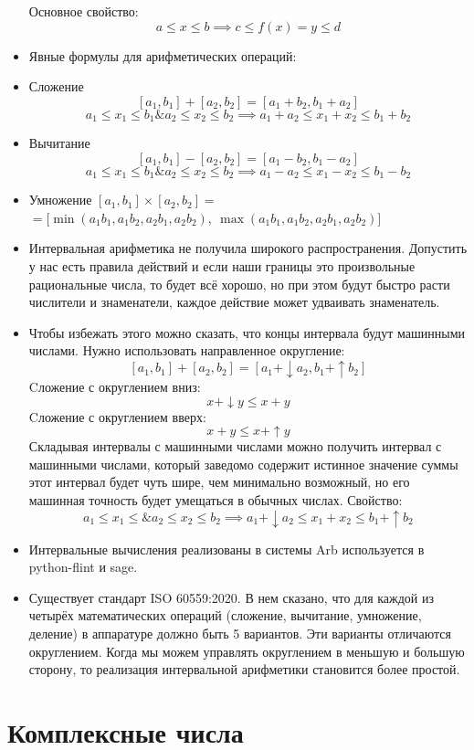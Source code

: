 \documentclass{article}
\begin{document}
\begin{itemize}
Основное свойство:
\[ a \leq x \leq b \implies c \leq f(x) = y \leq d \]
\item[] Явные формулы для арифметических операций:
\item[]Сложение
\[ [a_1, b_1] + [a_2, b_2] = [a_1 + b_2, b_1 + a_2] \]
\[ a_1 \leq x_1 \leq b_1 \& a_2 \leq x_2 \leq b_2 \implies a_1 + a_2 \leq x_1 + x_2 \leq b_1 + b_2 \]
\item[] Вычитание
\[ [a_1, b_1] - [a_2, b_2] = [a_1 - b_2, b_1 - a_2] \]
\[ a_1 \leq x_1 \leq b_1 \& a_2 \leq x_2 \leq b_2 \implies a_1 - a_2 \leq x_1 - x_2 \leq b_1 - b_2 \]
\item[] Умножение
 $[a_1, b_1] \times [a_2, b_2] = $
$= \bigl[\min(a_1 b_1, a_1 b_2, a_2 b_1, a_2 b_2),\ \max(a_1 b_1, a_1 b_2, a_2 b_1, a_2 b_2)\bigr]$
\item[] Интервальная арифметика не получила широкого распространения. Допустить у нас есть правила действий и если наши границы 
это произвольные рациональные числа, то будет всё хорошо, но при этом будут быстро расти числители и знаменатели, каждое действие
может удваивать знаменатель.
\item[] Чтобы избежать этого можно сказать, что концы интервала будут машинными числами. Нужно использовать направленное округление:
\[ [a_1, b_1] + [a_2, b_2] = [a_1 + {\downarrow} a_2, b_1 + {\uparrow} b_2] \]
Cложение с округлением вниз:
\[ x +{\downarrow} y \leq x + y \]
Cложение с округлением вверх:
\[ x + y \leq x +{\uparrow} y \]
Складывая интервалы с машинными числами можно получить интервал с машинными числами, который заведомо содержит истинное 
значение суммы этот интервал будет чуть шире, чем минимально возможный, но его машинная точность будет умещаться в обычных числах.
Свойство:
\[ a_1 \leq x_1 \leq \& a_2 \leq x_2 \leq b_2 \implies a_1 +{\downarrow} a_2 \leq x_1 + x_2 \leq b_1 +{\uparrow} b_2\]
\item[] Интервальные вычисления реализованы в системы Arb  используется в python-flint и sage.
\item[] Существует стандарт ISO 60559:2020. В нем сказано, что для каждой из четырёх математических операций
(сложение, вычитание, умножение, деление) в аппаратуре должно быть 5 вариантов. Эти варианты отличаются округлением. Когда 
мы можем управлять округлением в меньшую и большую сторону, то реализация интервальной арифметики становится более простой.
\end{itemize} 
\section{Комплексные числа}
\end{document}
